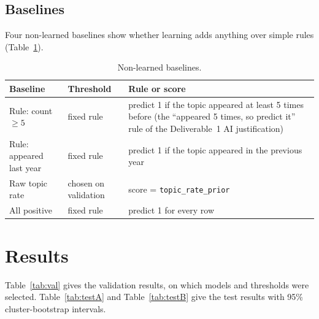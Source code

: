 \documentclass[11pt,a4paper]{article}
\newcommand{\trp}{\texttt{topic\_rate\_prior}}
\begin{document}
\subsection{Baselines}
Four non-learned baselines show whether learning adds anything over simple rules (Table~\ref{tab:baselines}).

\begin{table}[!htb]
\centering
\small
\begin{tabular}{llp{5.6cm}}
\toprule
Baseline & Threshold & Rule or score \\
\midrule
Rule: count $\geq 5$ & fixed rule & predict 1 if the topic appeared at least 5 times before (the ``appeared 5 times, so
predict it'' rule of the Deliverable~1 AI justification) \\
Rule: appeared last year & fixed rule & predict 1 if the topic appeared in the previous year \\
Raw topic rate & chosen on validation & score = \trp{} \\
All positive & fixed rule & predict 1 for every row \\
\bottomrule
\end{tabular}
\caption{Non-learned baselines.}
\label{tab:baselines}
\end{table}

\section{Results}
\label{sec:results}

Table~\ref{tab:val} gives the validation results, on which models and thresholds were selected. Table~\ref{tab:testA}
and Table~\ref{tab:testB} give the test results with 95\% cluster-bootstrap intervals.
\end{document}
